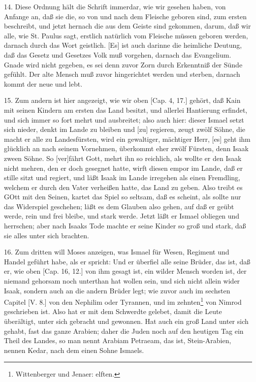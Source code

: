 14. Diese Ordnung hält die Schrift immerdar, wie wir gesehen haben, von Anfange an, daß sie die, so von und nach dem Fleische geboren sind, zum ersten beschreibt, und jetzt hernach die aus dem Geiste sind gekommen, darum, daß wir alle, wie St. Paulus sagt, erstlich natürlich vom Fleische müssen geboren werden, darnach durch das Wort geistlich. [Es] ist auch darinne die heimliche Deutung, daß das Gesetz und Gesetzes Volk muß vorgehen, darnach das Evangelium. Gnade wird nicht gegeben, es sei denn zuvor Zorn durch Erkenntniß der Sünde gefühlt. Der alte Mensch muß zuvor hingerichtet werden und sterben, darnach kommt der neue und lebt.

15. Zum andern ist hier angezeigt, wie wir oben [Cap. 4, 17.] gehört, daß Kain mit seinen Kindern am ersten das Land besitzt, und allerlei Hantierung erfindet, und sich immer so fort mehrt und ausbreitet; also auch hier: dieser Ismael setzt sich nieder, denkt im Lande zu bleiben und [zu] regieren, zeugt zwölf Söhne, die macht er alle zu Landesfürsten, wird ein gewaltiger, mächtiger Herr, [es] geht ihm glücklich an nach seinem Vornehmen, überkommt eher zwölf Fürsten, denn Isaak zween Söhne. So [ver]fährt Gott, mehrt ihn so reichlich, als wollte er den Isaak nicht mehren, den er doch gesegnet hatte, wirft diesen empor im Lande, daß er stille sitzt und regiert, und läßt Isaak im Lande irregehen als einen Fremdling, welchem er durch den Vater verheißen hatte, das Land zu geben. Also treibt es GOtt mit den Seinen, kartet das Spiel so seltsam, daß es scheint, als sollte nur das Widerspiel geschehen; läßt es dem Glauben also gehen, auf daß er geübt werde, rein und frei bleibe, und stark werde. Jetzt läßt er Ismael obliegen und herrschen; aber nach Isaaks Tode machte er seine Kinder so groß und stark, daß sie alles unter sich brachten.

16. Zum dritten will Moses anzeigen, was Ismael für Wesen, Regiment und Handel geführt habe, als er spricht: Und er überfiel alle seine Brüder, das ist, daß er, wie oben [Cap. 16, 12.] von ihm gesagt ist, ein wilder Mensch worden ist, der niemand gehorsam noch unterthan hat wollen sein, und sich nicht allein wider Isaak, sondern auch an die andern Brüder legt; wie zuvor auch im sechsten Capitel [V. 8.] von den Nephilim oder Tyrannen, und im zehnten\footnote{Wittenberger und Jenaer: elften.} von Nimrod geschrieben ist. Also hat er mit dem Schwerdte gelebet, damit die Leute überältigt, unter sich gebracht und gewonnen. Hat auch ein groß Land unter sich gehabt, fast das ganze Arabien; daher die Juden noch auf den heutigen Tag ein Theil des Landes, so man nennt Arabiam Petraeam, das ist, Stein-Arabien, nennen Kedar, nach dem einen Sohne Ismaels.

